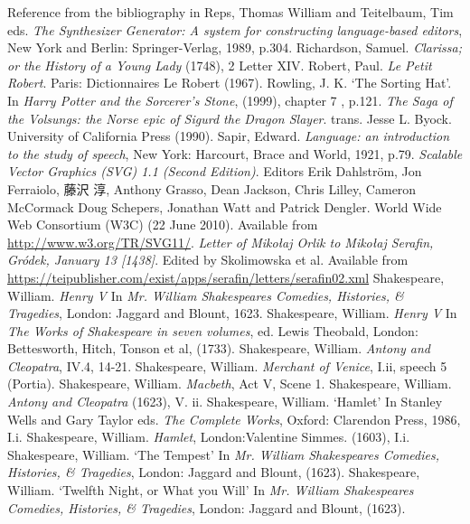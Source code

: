 \begin{bibitemlist}{1}
 Reference from the bibliography in Reps, Thomas William and Teitelbaum, Tim eds. \textit{The Synthesizer Generator: A system for constructing language-based editors}, New York and Berlin: Springer-Verlag, 1989, p.304.
 Richardson, Samuel. \textit{Clarissa; or the History of a Young Lady} (1748), 2 Letter XIV.
 Robert, Paul. \textit{Le Petit Robert}. Paris: Dictionnaires Le Robert (1967).
 Rowling, J. K. ‘The Sorting Hat’. In \textit{Harry Potter and the Sorcerer's Stone}, (1999), chapter 7 , p.121.
 \textit{The Saga of the Volsungs: the Norse epic of Sigurd the Dragon Slayer}. trans. Jesse L. Byock. University of California Press (1990).
 Sapir, Edward. \textit{Language: an introduction to the study of speech}, New York: Harcourt, Brace and World, 1921, p.79.
 \textit{Scalable Vector Graphics (SVG) 1.1 (Second Edition)}. Editors Erik Dahlström, Jon Ferraiolo, {\textJapanese 藤沢 淳}, Anthony Grasso, Dean Jackson, Chris Lilley, Cameron McCormack Doug Schepers, Jonathan Watt and Patrick Dengler. World Wide Web Consortium (W3C) (22 June 2010). Available from \url{http://www.w3.org/TR/SVG11/}.
 \textit{Letter of Mikołaj Orlik to Mikołaj Serafin, Gródek, January 13 [1438]}. Edited by Skolimowska et al. Available from \url{https://teipublisher.com/exist/apps/serafin/letters/serafin02.xml}
 Shakespeare, William. \textit{Henry V} In \textit{Mr. William Shakespeares Comedies, Histories, \& Tragedies}, London: Jaggard and Blount, 1623.
 Shakespeare, William. \textit{Henry V} In \textit{The Works of Shakespeare in seven volumes}, ed. Lewis Theobald, London: Bettesworth, Hitch, Tonson et al, (1733).
 Shakespeare, William. \textit{Antony and Cleopatra}, IV.4, 14-21.
 Shakespeare, William. \textit{Merchant of Venice}, I.ii, speech 5 (Portia).
 Shakespeare, William. \textit{Macbeth}, Act V, Scene 1.
 Shakespeare, William. \textit{Antony and Cleopatra} (1623), V. ii.
 Shakespeare, William. ‘Hamlet’ In Stanley Wells and Gary Taylor eds. \textit{The Complete Works}, Oxford: Clarendon Press, 1986, I.i.
 Shakespeare, William. \textit{Hamlet}, London:Valentine Simmes. (1603), I.i.
 Shakespeare, William. ‘The Tempest’ In \textit{Mr. William Shakespeares Comedies, Histories, \& Tragedies}, London: Jaggard and Blount, (1623).
 Shakespeare, William. ‘Twelfth Night, or What you Will’ In \textit{Mr. William Shakespeares Comedies, Histories, \& Tragedies}, London: Jaggard and Blount, (1623).

\end{bibitemlist}
